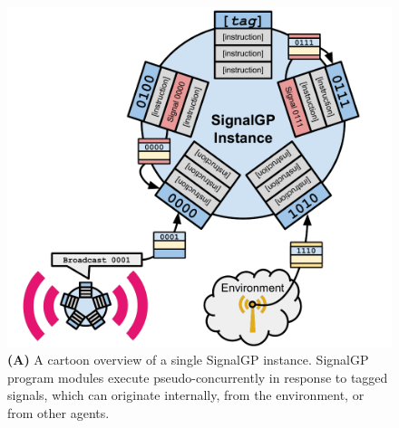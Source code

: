 \begin{figure}
\begin{center}
\begin{minipage}[t]{0.5\linewidth}

\begin{minipage}[t]{\linewidth}
\centering
\vspace{0pt} %
\begin{minipage}{\textwidth}
\includegraphics[width=\linewidth]{img/signalgp-cartoon}
{\textbf{(A)}
A cartoon overview of a single SignalGP instance.
SignalGP program modules execute pseudo-concurrently in response to tagged signals, which can originate internally, from the environment, or from other agents.
}
\end{minipage}
\end{minipage}%


\end{minipage}
\end{center}
\end{figure}
